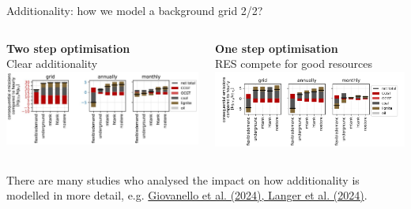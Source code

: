 \begin{frame}{Additionality: how we model a background grid 2/2?}
\begin{columns}[t]
	\begin{column}{0.5\textwidth}
		\centering
		\textbf{Two step optimisation} \\
			Clear additionality
			\includegraphics[width=1\linewidth]{images/emissions_twostep_v2}		
	\end{column}
	\begin{column}{0.5\textwidth}
		\centering
		\textbf{One step optimisation} \\
		RES compete for good resources
			\includegraphics[width=1\linewidth]{images/onestepoptimisation}
	\end{column}
\end{columns}
 There are many studies who analysed the impact on how additionality is modelled in more detail, e.g. \href{https://www.nature.com/articles/s41560-023-01435-0}{Giovanello et al. (2024), \href{https://papers.ssrn.com/sol3/papers.cfm?abstract_id=4636218}{Langer et al. (2024)}}.
\end{frame}

